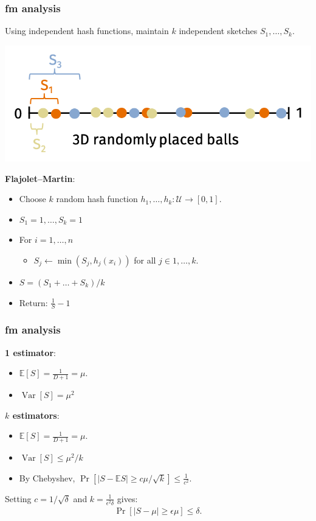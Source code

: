\documentclass[compress]{beamer}
\newcommand{\E}{\mathbb{E}}
\DeclareMathOperator{\Var}{Var}
\begin{document}
\begin{frame}
	\frametitle{fm analysis}
	Using independent hash functions, maintain $k$ independent sketches $S_1, \ldots, S_k$.
\vspace{-1em}
\begin{center}
	\includegraphics[width=.7\textwidth]{improvedFM.png}
\end{center}

\vspace{-1em}	
\textbf{Flajolet–Martin}:
		\begin{itemize}
			\item Choose $k$ random hash function $h_1, \ldots, h_k: \mathcal{U} \rightarrow [0,1]$.
			\item $S_1 = 1, \ldots, S_k = 1$ 
			\item For $i = 1, \ldots, n$
			\begin{itemize}
				\item $S_j \leftarrow \min(S_j, h_j(x_i))$ for all $j \in 1, \ldots, k$.
			\end{itemize} 
			\item $S = (S_1 + \ldots + S_k)/k$
			\item Return: $\frac{1}{S} - 1$
		\end{itemize}
\end{frame}

\begin{frame}
	\frametitle{fm analysis}
	\textbf{1 estimator}:
	\begin{itemize}
		\item $\E[S] = \frac{1}{D+1} = \mu.$
		\item $\Var[S] = \mu^2$
	\end{itemize}
	\textbf{$k$ estimators}:
	\begin{itemize}
		\item $\E[S] = \frac{1}{D+1} = \mu.$
		\item $\Var[S] \leq  \mu^2/k$
		\item By Chebyshev, $\Pr[|S - \E S| \geq c \mu/\sqrt{k}] \leq \frac{1}{c^2}$.
	\end{itemize}

	Setting $c = 1/\sqrt{\delta}$ and $k = \frac{1}{\epsilon^2\delta}$ gives:
	\begin{align*}
		\Pr[|S - \mu| \geq \epsilon \mu] \leq \delta.
	\end{align*}
\end{frame}
\end{document}
